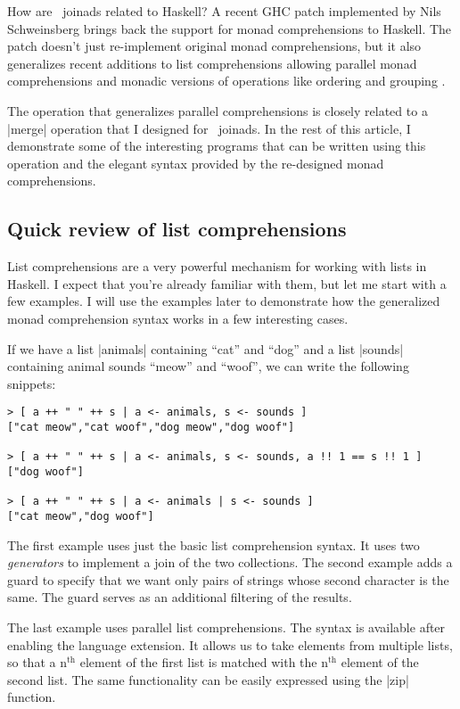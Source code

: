 \documentclass{tmr}
\begin{document}
How are \fsharp \ joinads related to Haskell? A recent GHC patch implemented by Nils Schweinsberg 
\cite{bringbackmc, comprefun} brings back the support for monad comprehensions to Haskell. 
The patch doesn't just re-implement original monad comprehensions, but it also generalizes recent 
additions to list comprehensions allowing parallel monad comprehensions and monadic 
versions of operations like ordering and grouping \cite{groupordercompre}. 

The operation that generalizes parallel comprehensions is closely related to a |merge| operation 
that I designed for \fsharp \ joinads. In the rest of this article, I demonstrate some of the 
interesting programs that can be written using this operation and the elegant syntax provided by 
the re-designed monad comprehensions. 


\subsection{Quick review of list comprehensions}
List comprehensions are a very powerful mechanism for working with lists in Haskell. I expect that 
you're already familiar with them, but let me start with a few examples. I will use the examples 
later to demonstrate how the generalized monad comprehension syntax works in a few interesting cases.

If we have a list |animals| containing ``cat'' and ``dog'' and a list |sounds| containing 
animal sounds ``meow'' and ``woof'', we can write the following snippets:

\begin{verbatim}
> [ a ++ " " ++ s | a <- animals, s <- sounds ]
["cat meow","cat woof","dog meow","dog woof"]

> [ a ++ " " ++ s | a <- animals, s <- sounds, a !! 1 == s !! 1 ]
["dog woof"]

> [ a ++ " " ++ s | a <- animals | s <- sounds ]
["cat meow","dog woof"]
\end{verbatim}
The first example uses just the basic list comprehension syntax. It uses two \textit{generators}
to implement a join of the two collections. The second example adds a guard to specify that we
want only pairs of strings whose second character is the same. The guard serves as an additional
filtering of the results.

The last example uses parallel list comprehensions. The syntax is available after enabling the 
 language extension. It allows us to take elements from multiple lists, so
that a n$^\text{th}$ element of the first list is matched with the n$^\text{th}$ element of the 
second list. The same functionality can be easily expressed using the |zip| function. 
\end{document}
